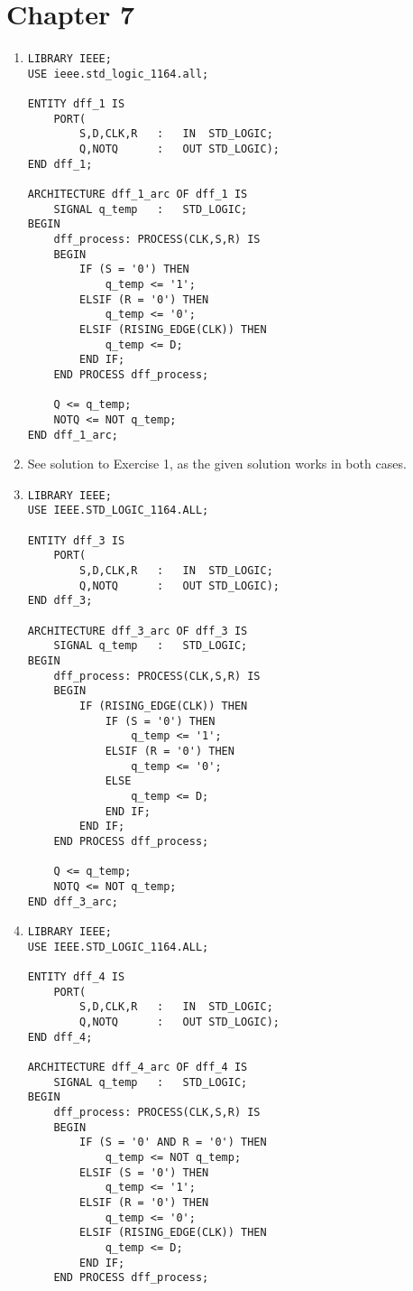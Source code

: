 \section*{Chapter 7}
\begin{enumerate}
	\item
	\begin{lstlisting}
LIBRARY IEEE;
USE ieee.std_logic_1164.all;

ENTITY dff_1 IS
	PORT(
		S,D,CLK,R	:	IN	STD_LOGIC;
		Q,NOTQ		:	OUT	STD_LOGIC);
END dff_1;

ARCHITECTURE dff_1_arc OF dff_1 IS
	SIGNAL q_temp	:	STD_LOGIC;
BEGIN
	dff_process: PROCESS(CLK,S,R) IS
	BEGIN
		IF (S = '0') THEN
			q_temp <= '1';
		ELSIF (R = '0') THEN
			q_temp <= '0';
		ELSIF (RISING_EDGE(CLK)) THEN
			q_temp <= D;
		END IF;
	END PROCESS dff_process;

	Q <= q_temp;
	NOTQ <= NOT q_temp;
END dff_1_arc;
	\end{lstlisting}
	\item See solution to Exercise 1, as the given solution works in both cases.

	\item
	\begin{lstlisting}
LIBRARY IEEE;
USE IEEE.STD_LOGIC_1164.ALL;

ENTITY dff_3 IS
	PORT(
		S,D,CLK,R	:	IN	STD_LOGIC;
		Q,NOTQ		:	OUT	STD_LOGIC);
END dff_3;

ARCHITECTURE dff_3_arc OF dff_3 IS
	SIGNAL q_temp	:	STD_LOGIC;
BEGIN
	dff_process: PROCESS(CLK,S,R) IS
	BEGIN
		IF (RISING_EDGE(CLK)) THEN
			IF (S = '0') THEN
				q_temp <= '1';
			ELSIF (R = '0') THEN
				q_temp <= '0';
			ELSE
				q_temp <= D;
			END IF;
		END IF;
	END PROCESS dff_process;

	Q <= q_temp;
	NOTQ <= NOT q_temp;
END dff_3_arc;
	\end{lstlisting}

	\item
	\begin{lstlisting}
LIBRARY IEEE;
USE IEEE.STD_LOGIC_1164.ALL;

ENTITY dff_4 IS
	PORT(
		S,D,CLK,R	:	IN	STD_LOGIC;
		Q,NOTQ		:	OUT	STD_LOGIC);
END dff_4;

ARCHITECTURE dff_4_arc OF dff_4 IS
	SIGNAL q_temp	:	STD_LOGIC;
BEGIN
	dff_process: PROCESS(CLK,S,R) IS
	BEGIN
		IF (S = '0' AND R = '0') THEN
			q_temp <= NOT q_temp;
		ELSIF (S = '0') THEN
			q_temp <= '1';
		ELSIF (R = '0') THEN
			q_temp <= '0';
		ELSIF (RISING_EDGE(CLK)) THEN
			q_temp <= D;
		END IF;
	END PROCESS dff_process;


\end{lstlisting}
\end{enumerate}
